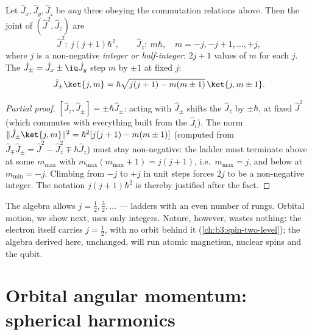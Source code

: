 \begin{theorem}\label{thm:b3:quantum-angular-momentum:spectrum}
Let $\hat J_x, \hat J_y, \hat J_z$ be \emph{any} three  obeying the commutation relations above. Then the joint
 of $(\hat J^2, \hat J_z)$ are
\[
\hat J^2:\ j(j+1)\hbar^2 , \qquad
\hat J_z:\ m\hbar , \quad m = -j, -j+1, \dots, +j ,
\]
where $j$ is a non-negative \emph{integer or half-integer}: $2j + 1$
values of $m$ for each $j$. The  $\hat J_\pm = \hat
J_x \pm \iu\hat J_y$ step $m$ by $\pm1$ at fixed $j$:
\[
\hat J_\pm\ket{j,m} = \hbar\sqrt{j(j+1) - m(m\pm1)}\,\ket{j,m\pm1} .
\]
\end{theorem}

\begin{proof}[Partial proof]
$[\hat J_z, \hat J_\pm] = \pm\hbar\hat J_\pm$: acting with $\hat
J_\pm$ shifts the $\hat J_z$  by $\pm\hbar$, at fixed
$\hat J^2$ (which commutes with everything built from the $\hat
J_i$). The norm $\|\hat J_\pm\ket{j,m}\|^2 = \hbar^2[j(j+1) -
m(m\pm1)]$ (computed from $\hat J_\mp\hat J_\pm = \hat J^2 - \hat
J_z^2 \mp \hbar\hat J_z$) must stay non-negative: the ladder must
terminate above at some $m_{\max}$ with $m_{\max}(m_{\max}+1) =
j(j+1)$, i.e.\ $m_{\max} = j$, and below at $m_{\min} = -j$.
Climbing from $-j$ to $+j$ in unit steps forces $2j$ to be a
non-negative integer. The  notation $j(j+1)\hbar^2$ is
thereby justified after the fact.
\end{proof}

\begin{remark}\label{rem:b3:quantum-angular-momentum:halfinteger}
The algebra allows $j = \tfrac12, \tfrac32, \dots$ --- ladders with
an even number of rungs. Orbital motion, we show next, uses only
integers. Nature, however, wastes nothing: the electron itself
carries $j = \tfrac12$, with no orbit behind it
(\cref{ch:b3:spin-two-level}); the algebra derived here, unchanged,
will run atomic magnetism, nuclear spins and the qubit.
\end{remark}

\section{Orbital angular momentum: spherical harmonics}

